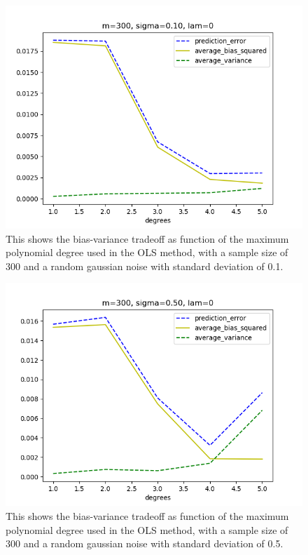 \FloatBarrier
\begin{figure}[!ht]
	\centering
	\FloatBarrier
	\includegraphics[width=1\textwidth]{plot_ols_without_r2/olsprediction_error_vs_degrees_m300_l300_s10.png}
	
	\caption{This shows the bias-variance tradeoff as function of the maximum polynomial degree used in the OLS method, with a sample size of 300 and a random gaussian noise with standard deviation of 0.1.}
	\label{fig:1}
\end{figure}
\FloatBarrier

\medskip

\FloatBarrier
\begin{figure}[!ht]
	\centering
	\FloatBarrier
	\includegraphics[width=1\textwidth]{plot_ols_without_r2/olsprediction_error_vs_degrees_m300_l300_s50.png}
	
	\caption{This shows the bias-variance tradeoff as function of the maximum polynomial degree used in the OLS method, with a sample size of 300 and a random gaussian noise with standard deviation of 0.5.}
	\label{fig:1}
\end{figure}
\FloatBarrier

